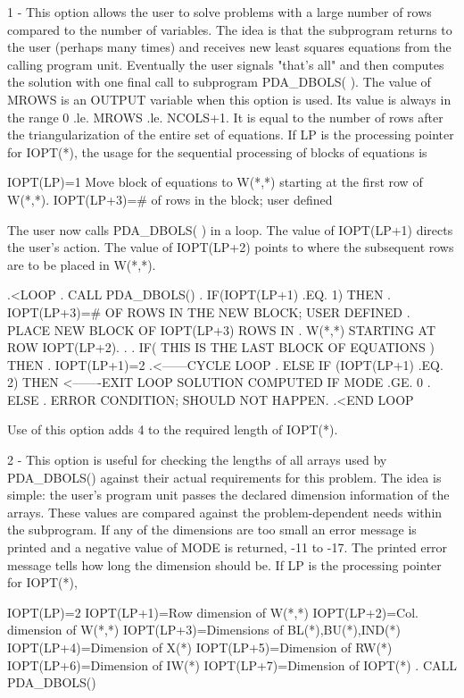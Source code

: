 \documentclass[11pt,twoside,nolof]{starlink}
\begin{document}
\begin{terminalv}
   1
   -
     This option allows the user to solve problems with a large number
     of rows compared to the number of variables. The idea is that the
     subprogram returns to the user (perhaps many times) and receives
     new least squares equations from the calling program unit.
     Eventually the user signals "that's all" and then computes the
     solution with one final call to subprogram PDA_DBOLS( ). The value of
     MROWS is an OUTPUT variable when this option is used. Its value
     is always in the range 0 .le. MROWS .le. NCOLS+1. It is equal to
     the number of rows after the triangularization of the entire set
     of equations. If LP is the processing pointer for IOPT(*), the
     usage for the sequential processing of blocks of equations is

        IOPT(LP)=1
        Move block of equations to W(*,*) starting at
        the first row of W(*,*).
        IOPT(LP+3)=# of rows in the block; user defined

     The user now calls PDA_DBOLS( ) in a loop. The value of IOPT(LP+1)
     directs the user's action. The value of IOPT(LP+2) points to
     where the subsequent rows are to be placed in W(*,*).

      .<LOOP
      . CALL PDA_DBOLS()
      . IF(IOPT(LP+1) .EQ. 1) THEN
      .    IOPT(LP+3)=# OF ROWS IN THE NEW BLOCK; USER DEFINED
      .    PLACE NEW BLOCK OF IOPT(LP+3) ROWS IN
      .    W(*,*) STARTING AT ROW IOPT(LP+2).
      .
      .    IF( THIS IS THE LAST BLOCK OF EQUATIONS ) THEN
      .       IOPT(LP+1)=2
      .<------CYCLE LOOP
      .    ELSE IF (IOPT(LP+1) .EQ. 2) THEN
      <-------EXIT LOOP SOLUTION COMPUTED IF MODE .GE. 0
      . ELSE
      . ERROR CONDITION; SHOULD NOT HAPPEN.
      .<END LOOP

     Use of this option adds 4 to the required length of IOPT(*).


   2
   -
     This option is useful for checking the lengths of all arrays used
     by PDA_DBOLS() against their actual requirements for this problem.
     The idea is simple: the user's program unit passes the declared
     dimension information of the arrays. These values are compared
     against the problem-dependent needs within the subprogram. If any
     of the dimensions are too small an error message is printed and a
     negative value of MODE is returned, -11 to -17. The printed error
     message tells how long the dimension should be. If LP is the
     processing pointer for IOPT(*),

        IOPT(LP)=2
        IOPT(LP+1)=Row dimension of W(*,*)
        IOPT(LP+2)=Col. dimension of W(*,*)
        IOPT(LP+3)=Dimensions of BL(*),BU(*),IND(*)
        IOPT(LP+4)=Dimension of X(*)
        IOPT(LP+5)=Dimension of RW(*)
        IOPT(LP+6)=Dimension of IW(*)
        IOPT(LP+7)=Dimension of IOPT(*)
         .
        CALL PDA_DBOLS()


\end{terminalv}
\end{document}

